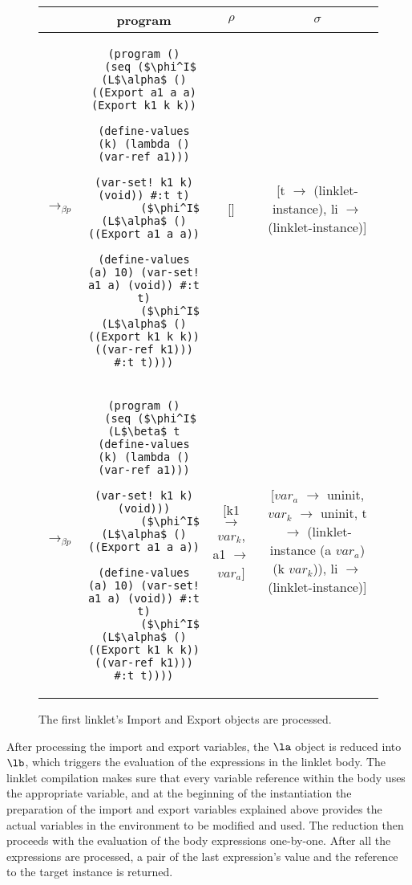 \begin{figure}[h!]
  \centering
  \footnotesize
  \begin{tabular}{lc|c|c}
    &\textbf{program} & \textbf{$\rho$} & \textbf{$\sigma$} \\ \hline \hline
    $\longrightarrow_{\beta p}$&\begin{lstlisting}[mathescape]
(program ()
  (seq ($\phi^I$ (L$\alpha$ () ((Export a1 a a) (Export k1 k k))
                (define-values (k) (lambda () (var-ref a1)))
                (var-set! k1 k) (void)) #:t t)
        ($\phi^I$ (L$\alpha$ () ((Export a1 a a))
                (define-values (a) 10) (var-set! a1 a) (void)) #:t t)
        ($\phi^I$ (L$\alpha$ () ((Export k1 k k)) ((var-ref k1))) #:t t))))
    \end{lstlisting} & [] & \thead{[t $\rightarrow$ (linklet-instance), \\li $\rightarrow$ (linklet-instance)]} \\ \hline
    $\longrightarrow_{\beta p}$&\begin{lstlisting}[mathescape]
(program ()
  (seq ($\phi^I$ (L$\beta$ t (define-values (k) (lambda () (var-ref a1)))
                      (var-set! k1 k) (void)))
        ($\phi^I$ (L$\alpha$ () ((Export a1 a a))
                (define-values (a) 10) (var-set! a1 a) (void)) #:t t)
        ($\phi^I$ (L$\alpha$ () ((Export k1 k k)) ((var-ref k1))) #:t t))))
    \end{lstlisting} & \thead{[k1 $\rightarrow$ $var_k$, \\a1 $\rightarrow$ $var_a$]} & \thead{[$var_a$ $\rightarrow$ uninit,\\ $var_k$ $\rightarrow$ uninit,\\ t $\rightarrow$ (linklet-instance \\ (a $var_a$) (k $var_k$)), \\li $\rightarrow$ (linklet-instance)]} \\ \hline
  \end{tabular}
  \caption{The first linklet's Import and Export objects are processed.}
\end{figure}

After processing the import and export variables, the $\la$ object is
reduced into $\lb$, which triggers the evaluation of the expressions
in the linklet body. The linklet compilation makes sure that every
variable reference within the body uses the appropriate variable, and
at the beginning of the instantiation the preparation of the import
and export variables explained above provides the actual variables in
the environment to be modified and used. The reduction then proceeds
with the evaluation of the body expressions one-by-one. After all the
expressions are processed, a pair of the last expression's value and
the reference to the target instance is returned.

